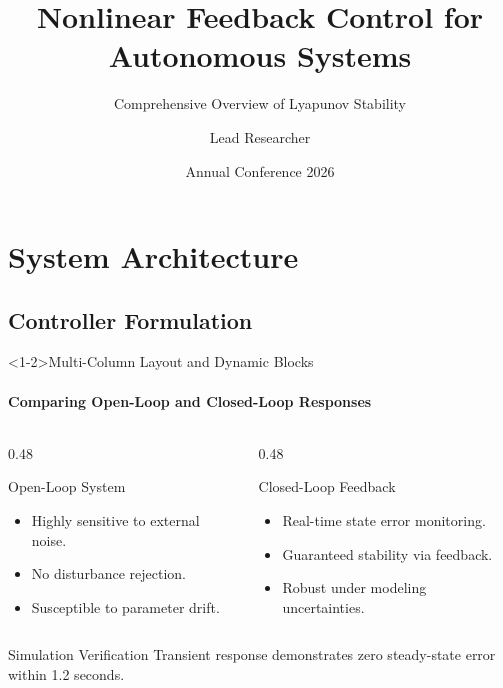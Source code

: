 \documentclass{beamer}
\title[Robotics Control]{Nonlinear Feedback Control for Autonomous Systems}
\subtitle{Comprehensive Overview of Lyapunov Stability}
\author[Dr. Researcher]{Lead Researcher}
\institute[Univ. Lab]{Laboratory for Intelligent Robotics}
\date[2026]{Annual Conference 2026}
\begin{document}
\begin{frame}
  \titlepage
\end{frame}

\section{System Architecture}
\subsection{Controller Formulation}

\begin{frame}<1-2>{Multi-Column Layout and Dynamic Blocks}
  \framesubtitle{Comparing Open-Loop and Closed-Loop Responses}
  \begin{columns}[T]
    \begin{column}{0.48\textwidth}
      \begin{block}{Open-Loop System}
        \begin{itemize}
          \item Highly sensitive to external noise.
          \item No disturbance rejection.
          \item Susceptible to parameter drift.
        \end{itemize}
      \end{block}
    \end{column}
    \begin{column}{0.48\textwidth}
      \begin{alertblock}{Closed-Loop Feedback}
        \begin{itemize}
          \item Real-time state error monitoring.
          \item Guaranteed stability via feedback.
          \item Robust under modeling uncertainties.
        \end{itemize}
      \end{alertblock}
    \end{column}
  \end{columns}

  \pause
  \vspace{0.3cm}
  \begin{exampleblock}{Simulation Verification}
    Transient response demonstrates zero steady-state error within 1.2 seconds.
  \end{exampleblock}
\end{frame}
\end{document}
